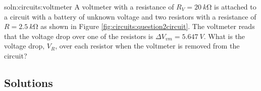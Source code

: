 \begin{problem}{soln:circuits:voltmeter}{\label{prob:circuits:voltmeter}}
A voltmeter with a resistance of $R_V = \SI{20}{k\ohm}$ is attached to a circuit with a battery of unknown voltage and two resistors with a resistance of $R = \SI{2.5}{k\ohm}$ as shown in Figure \ref{fig:circuits:question2circuit}. The voltmeter reads that the voltage drop over one of the resistors is $\Delta V_{vm} = \SI{5.647}{V}$. What is the voltage drop, $V_R$, over each resistor when the voltmeter is removed from the circuit?
\end{problem}

\newpage
\subsection{Solutions}
